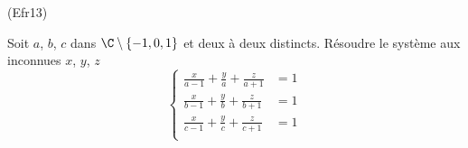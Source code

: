 \begin{tiny}(Efr13)\end{tiny} Soit $a$, $b$, $c$ dans $\C\setminus\left\lbrace -1, 0, 1\right\rbrace$ et deux à deux distincts. Résoudre le système aux inconnues $x$, $y$, $z$
\begin{displaymath}
\left\lbrace 
\begin{aligned}
  \frac{x}{a-1} + \frac{y}{a} + \frac{z}{a+1} &= 1 \\
  \frac{x}{b-1} + \frac{y}{b} + \frac{z}{b+1} &= 1 \\
  \frac{x}{c-1} + \frac{y}{c} + \frac{z}{c+1} &= 1 \\
\end{aligned}
\right. 
\end{displaymath}
